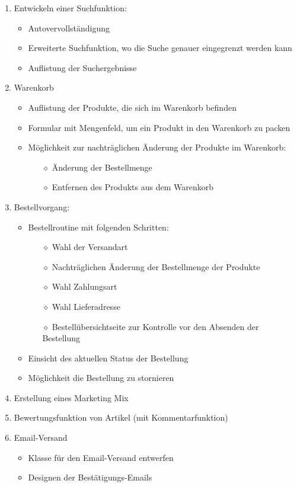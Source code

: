 \begin{enumerate}
\begin{itemize}
	\end{itemize}
	\item Entwickeln einer Suchfunktion:
	\begin{itemize}
		\item Autovervollständigung
		\item Erweiterte Suchfunktion, wo die Suche genauer eingegrenzt werden kann
		\item Auflistung der Suchergebnisse
	\end{itemize}
	\item Warenkorb
	\begin{itemize}
		\item Auflistung der Produkte, die sich im Warenkorb befinden
		\item Formular mit Mengenfeld, um ein Produkt in den Warenkorb zu packen
		\item Möglichkeit zur nachträglichen Änderung der Produkte im Warenkorb:
		\begin{itemize}
			\item[$\diamond$] Änderung der Bestellmenge
			\item[$\diamond$] Entfernen des Produkts aus dem Warenkorb
		\end{itemize}
	\end{itemize}
	\item Bestellvorgang:
	\begin{itemize}
		\item Bestellroutine mit folgenden Schritten:
		\begin{itemize}
			\item[$\diamond$] Wahl der Versandart
			\item[$\diamond$] Nachträglichen Änderung der Bestellmenge der Produkte
			\item[$\diamond$] Wahl Zahlungsart
			\item[$\diamond$] Wahl Lieferadresse
			\item[$\diamond$] Bestellübersichtseite zur Kontrolle vor den Absenden der Bestellung
		\end{itemize}
		\item Einsicht des aktuellen Status der Bestellung
		\item Möglichkeit die Bestellung zu stornieren
	\end{itemize}
	
	\item Erstellung eines Marketing Mix
	\item Bewertungsfunktion von Artikel (mit Kommentarfunktion)
	\item Email-Versand
	\begin{itemize}
		\item Klasse für den Email-Versand entwerfen
		\item Designen der Bestätigungs-Emails
	\end{itemize}					 
\end{enumerate}

